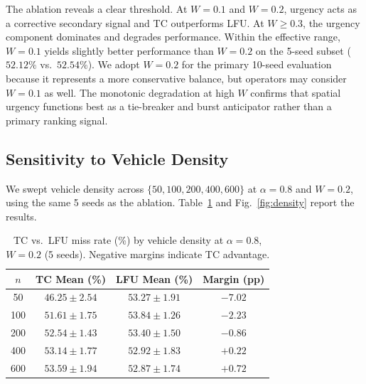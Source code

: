 \documentclass[preprint,12pt]{elsarticle}
\begin{document}
	The ablation reveals a clear threshold. At $W = 0.1$ and $W = 0.2$, urgency acts as a corrective secondary signal and TC outperforms LFU. At $W \geq 0.3$, the urgency component dominates and degrades performance. Within the effective range, $W = 0.1$ yields slightly better performance than $W = 0.2$ on the 5-seed subset ($52.12\%$ vs.\ $52.54\%$). We adopt $W = 0.2$ for the primary 10-seed evaluation because it represents a more conservative balance, but operators may consider $W = 0.1$ as well. The monotonic degradation at high $W$ confirms that spatial urgency functions best as a tie-breaker and burst anticipator rather than a primary ranking signal.
	
	\subsection{Sensitivity to Vehicle Density}
	\label{sec:density}
	
	We swept vehicle density across $\{50, 100, 200, 400, 600\}$ at $\alpha = 0.8$ and $W = 0.2$, using the same 5 seeds as the ablation. Table~\ref{tab:density} and Fig.~\ref{fig:density} report the results.
	
	\begin{table}[t]
		\centering
		\renewcommand{\arraystretch}{1.1}
		\caption{TC vs.\ LFU miss rate (\%) by vehicle density at $\alpha=0.8$, $W=0.2$ (5 seeds). Negative margins indicate TC advantage.}
		\label{tab:density}
		\begin{tabular}{cccc}
			\toprule
			$n$ & TC Mean (\%) & LFU Mean (\%) & Margin (pp) \\
			\midrule
			50  & $46.25 \pm 2.54$ & $53.27 \pm 1.91$ & $-7.02$ \\
			100 & $51.61 \pm 1.75$ & $53.84 \pm 1.26$ & $-2.23$ \\
			200 & $52.54 \pm 1.43$ & $53.40 \pm 1.50$ & $-0.86$ \\
			400 & $53.14 \pm 1.77$ & $52.92 \pm 1.83$ & $+0.22$ \\
			600 & $53.59 \pm 1.94$ & $52.87 \pm 1.74$ & $+0.72$ \\
			\bottomrule
		\end{tabular}
	\end{table}
	
\end{document}
